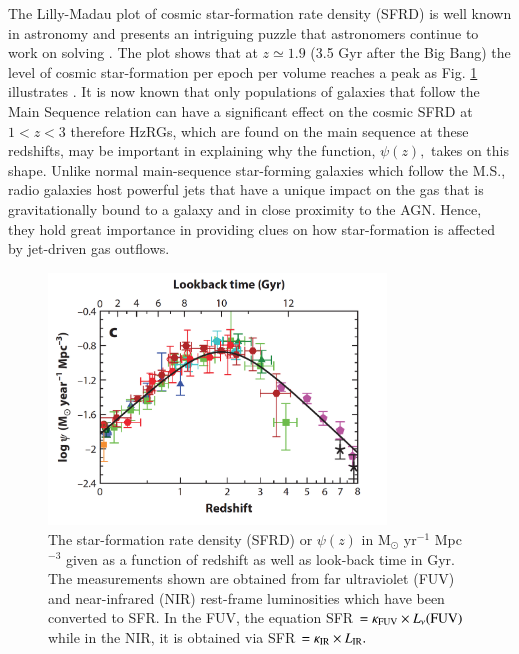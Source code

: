 The Lilly-Madau plot of cosmic star-formation rate density (SFRD) is well known in astronomy and presents an intriguing puzzle that astronomers continue to work on solving \citep{Lilly1995,Madau1996}. The plot shows that at $z \simeq 1.9$ (3.5 Gyr after the Big Bang) the level of cosmic star-formation per epoch per volume reaches a peak as Fig. \ref{fig:SFRD_z_Madau_Dickinson2014} illustrates \citep{MadauDickinson2014}. It is now known that only populations of galaxies that follow the Main Sequence relation can have a significant effect on the cosmic SFRD at $1 < z < 3$ therefore HzRGs, which are found on the main sequence at these redshifts, may be important in explaining why the function, $\psi(z),$ takes on this shape. Unlike normal main-sequence star-forming galaxies which follow the M.S., radio galaxies host powerful jets that have a unique impact on the gas that is gravitationally bound to a galaxy and in close proximity to the AGN. Hence, they hold great importance in providing clues on how star-formation is affected by jet-driven gas outflows. 

\begin{figure}[!ht]
   \centering
   \includegraphics[width=0.8\textwidth]{plots_chp1/SFRD_z_Madau_Dickinson_2014.png}
   \caption[SFRD as a function of redshift in \citet{MadauDickinson2014}]{The star-formation rate density (SFRD) or $\psi(z)$ in M$_\odot$ yr$^{-1}$ Mpc$^{-3}$ given as a function of redshift as well as look-back time in Gyr. The measurements shown are obtained from far ultraviolet (FUV) and near-infrared (NIR) rest-frame luminosities which have been converted to SFR. In the FUV, the equation SFR $= \kappa_{\rm{FUV}} \times L_\nu (\rm{FUV})$ while in the NIR, it is obtained via SFR $= \kappa_{\rm{IR}} \times L_{\rm{IR}}.$}
   \label{fig:SFRD_z_Madau_Dickinson2014}
\end{figure}

